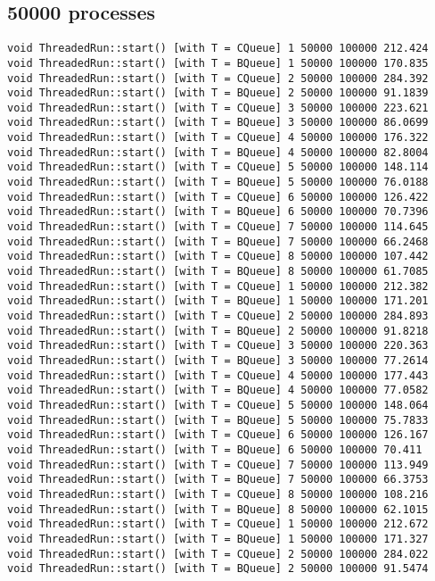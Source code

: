 \subsection{50000 processes}
\small
\begin{verbatim}
void ThreadedRun::start() [with T = CQueue] 1 50000 100000 212.424
void ThreadedRun::start() [with T = BQueue] 1 50000 100000 170.835
void ThreadedRun::start() [with T = CQueue] 2 50000 100000 284.392
void ThreadedRun::start() [with T = BQueue] 2 50000 100000 91.1839
void ThreadedRun::start() [with T = CQueue] 3 50000 100000 223.621
void ThreadedRun::start() [with T = BQueue] 3 50000 100000 86.0699
void ThreadedRun::start() [with T = CQueue] 4 50000 100000 176.322
void ThreadedRun::start() [with T = BQueue] 4 50000 100000 82.8004
void ThreadedRun::start() [with T = CQueue] 5 50000 100000 148.114
void ThreadedRun::start() [with T = BQueue] 5 50000 100000 76.0188
void ThreadedRun::start() [with T = CQueue] 6 50000 100000 126.422
void ThreadedRun::start() [with T = BQueue] 6 50000 100000 70.7396
void ThreadedRun::start() [with T = CQueue] 7 50000 100000 114.645
void ThreadedRun::start() [with T = BQueue] 7 50000 100000 66.2468
void ThreadedRun::start() [with T = CQueue] 8 50000 100000 107.442
void ThreadedRun::start() [with T = BQueue] 8 50000 100000 61.7085
void ThreadedRun::start() [with T = CQueue] 1 50000 100000 212.382
void ThreadedRun::start() [with T = BQueue] 1 50000 100000 171.201
void ThreadedRun::start() [with T = CQueue] 2 50000 100000 284.893
void ThreadedRun::start() [with T = BQueue] 2 50000 100000 91.8218
void ThreadedRun::start() [with T = CQueue] 3 50000 100000 220.363
void ThreadedRun::start() [with T = BQueue] 3 50000 100000 77.2614
void ThreadedRun::start() [with T = CQueue] 4 50000 100000 177.443
void ThreadedRun::start() [with T = BQueue] 4 50000 100000 77.0582
void ThreadedRun::start() [with T = CQueue] 5 50000 100000 148.064
void ThreadedRun::start() [with T = BQueue] 5 50000 100000 75.7833
void ThreadedRun::start() [with T = CQueue] 6 50000 100000 126.167
void ThreadedRun::start() [with T = BQueue] 6 50000 100000 70.411
void ThreadedRun::start() [with T = CQueue] 7 50000 100000 113.949
void ThreadedRun::start() [with T = BQueue] 7 50000 100000 66.3753
void ThreadedRun::start() [with T = CQueue] 8 50000 100000 108.216
void ThreadedRun::start() [with T = BQueue] 8 50000 100000 62.1015
void ThreadedRun::start() [with T = CQueue] 1 50000 100000 212.672
void ThreadedRun::start() [with T = BQueue] 1 50000 100000 171.327
void ThreadedRun::start() [with T = CQueue] 2 50000 100000 284.022
void ThreadedRun::start() [with T = BQueue] 2 50000 100000 91.5474

\end{verbatim}
